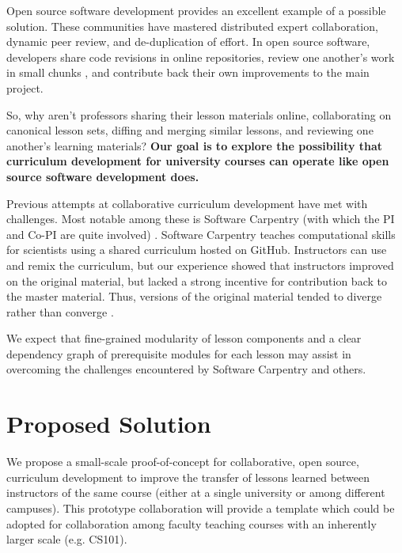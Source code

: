 \documentclass[11pt]{article}
\begin{document}
          Open source software development provides an excellent 
          example of a possible solution.
          These communities have mastered distributed expert collaboration, 
          dynamic peer review, and de-duplication of effort. In open source 
          software, developers share code revisions in online repositories, 
          review one another's work in small chunks \cite{wilson_best_2014}, 
          and contribute back their own improvements to the main project.

          So, why aren't professors sharing their lesson materials online, 
          collaborating on canonical lesson sets, diffing and merging similar 
          lessons, and reviewing one another's learning materials? \textbf{Our 
          goal is to explore the possibility that curriculum development for 
          university courses can operate like open source software development 
          does.}
           
          Previous attempts at collaborative curriculum development have met with 
          challenges. Most notable among these is Software Carpentry (with 
          which the PI and Co-PI are quite involved) 
          \cite{wilson_software_2014}.  Software Carpentry teaches 
          computational skills for scientists using a shared curriculum hosted 
          on GitHub. Instructors can use and remix the curriculum, but our 
          experience showed that instructors improved on the original material, 
          but lacked a  strong incentive for contribution back to the master 
          material. Thus, versions of the original material tended to diverge 
          rather than converge 
          \cite{wilson_software_2014,wilson_software_2014-1}. 
          
          We expect that 
          fine-grained modularity of lesson components and a clear dependency 
          graph of prerequisite modules for each lesson may assist in 
          overcoming the challenges encountered by Software Carpentry and 
          others.

          \section{Proposed Solution}
          We propose a small-scale proof-of-concept for collaborative, open 
          source, curriculum development to improve the transfer of lessons 
          learned between instructors of the same course (either at a single 
          university or among different campuses). This prototype collaboration 
          will provide a template which could be adopted for collaboration 
          among faculty teaching courses with an inherently larger scale (e.g. 
          CS101).
\end{document}
